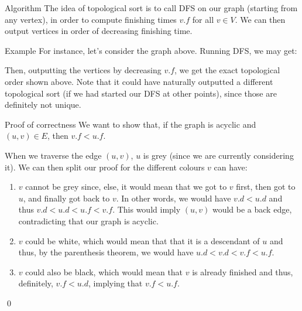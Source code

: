 \documentclass[a4paper]{article}
\begin{document}
\begin{parag}{Algorithm}
    The idea of topological sort is to call DFS on our graph (starting from any vertex), in order to compute finishing times $v.f$ for all $v \in V$. We can then output vertices in order of decreasing finishing time.

    \begin{subparag}{Example}
        For instance, let's consider the graph above. Running DFS, we may get:

        Then, outputting the vertices by decreasing $v.f$, we get the exact topological order shown above. Note that it could have naturally outputted a different topological sort (if we had started our DFS at other points), since those are definitely not unique.
    \end{subparag}

    \begin{subparag}{Proof of correctness}
        We want to show that, if the graph is acyclic and $\left(u, v\right) \in E$, then $v.f < u.f$.

        When we traverse the edge $\left(u, v\right)$, $u$ is grey (since we are currently considering it). We can then split our proof for the different colours $v$ can have:
        \begin{enumerate}[left=0pt]
            \item $v$ cannot be grey since, else, it would mean that we got to $v$ first, then got to $u$, and finally got back to $v$. In other words, we would have $v.d < u.d$ and thus $v.d < u.d < u.f < v.f$. This would imply $\left(u, v\right)$ would be a back edge, contradicting that our graph is acyclic. 
            \item $v$ could be white, which would mean that that it is a descendant of $u$ and thus, by the parenthesis theorem, we would have $u.d < v.d < v.f < u.f$. 
            \item $v$ could also be black, which would mean that $v$ is already finished and thus, definitely, $v.f < u.d$, implying that $v.f < u.f$.
        \end{enumerate}
        
        \qed
    \end{subparag}
\end{parag}
\end{document}
